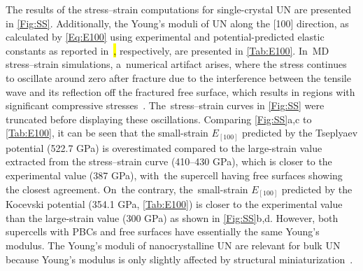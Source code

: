 \documentclass[applsci,article,accept,pdftex,moreauthors]{Definitions/mdpi}
\newcommand{\?}{\stackrel{?}{=}}
\begin{document}
The results of the stress--strain computations for single-crystal UN are presented in \cref{Fig:SS}. Additionally, the Young's moduli of UN along the [100] direction, as calculated by \cref{Eq:E100} using experimental and potential-predicted elastic constants as reported in~\cite{AbdulHameed2024,Salleh1986}\hl{,} %
 respectively, are presented in \cref{Tab:E100}. In~MD stress--strain simulations, a~numerical artifact arises, where the stress continues to oscillate around zero after fracture %
 due to the interference between the tensile wave and its reflection off the fractured free surface, which results in regions with significant compressive stresses~\cite{Wen2022}. The~stress--strain curves in \cref{Fig:SS} were truncated before displaying these oscillations. Comparing \cref{Fig:SS}a,c to \cref{Tab:E100}, it can be seen that the small-strain $E_{[100]}$ predicted by the Tseplyaev potential (522.7 GPa) is overestimated compared to the large-strain value extracted from the stress--strain curve (410--430 GPa), which is closer to the experimental value (387 GPa), with~the supercell having free surfaces showing the closest agreement. On~the contrary, the~small-strain $E_{[100]}$ predicted by the Kocevski potential (354.1 GPa, \cref{Tab:E100}) is closer to the experimental value than %
 the large-strain value (300 GPa) as shown in \cref{Fig:SS}b,d. However, both supercells with PBCs and free surfaces have essentially the same Young's modulus. The Young’s moduli of nanocrystalline UN are relevant for bulk UN because Young’s modulus is only slightly affected by structural miniaturization~\cite{Pal2020}.
\end{document}
